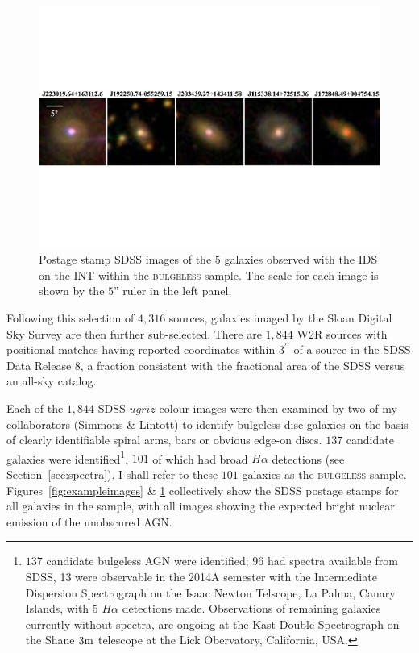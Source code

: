\begin{figure}
\centering
\includegraphics[width=\textwidth]{agn/mosaic_INT_gal_only.pdf}
\caption[SDSS images of 5 galaxies observed with the IDS on the INT]{Postage stamp SDSS images of the $5$ galaxies observed with the IDS on the INT within the \textsc{bulgeless} sample. The scale for each image is shown by the $5$'' ruler in the left panel.}
\label{fig:INTimages}
\end{figure}


Following this selection of $4,316$ sources, galaxies imaged by the Sloan Digital Sky Survey are then further sub-selected. There are $1,844$ W2R sources with positional matches having reported coordinates within $3^{\prime \prime}$ of a source in the SDSS \citep{york00} Data Release 8, a fraction consistent with the fractional area of the SDSS versus an all-sky catalog. %

Each of the $1, 844$ SDSS $ugriz$ colour images were then examined by two of my collaborators (Simmons \& Lintott) to identify bulgeless disc galaxies on the basis of clearly identifiable spiral arms, bars or obvious edge-on discs. $137$ candidate galaxies were identified\footnote{$137$ candidate bulgeless AGN were identified; 96 had spectra available from SDSS, 13 were observable in the 2014A semester with the Intermediate Dispersion Spectrograph on the Isaac Newton Telscope, La Palma, Canary Islands, with 5 $H\alpha$ detections made. Observations of remaining galaxies currently without spectra, are ongoing at the Kast Double Spectrograph on the Shane $3\rm{m}$ telescope at the Lick Obervatory, California, USA.}, $101$ of which had broad $H\alpha$ detections (see Section~\ref{sec:spectra}). I shall refer to these $101$ galaxies as the \textsc{bulgeless} sample. Figures~\ref{fig:exampleimages} \& \ref{fig:INTimages} collectively show the SDSS postage stamps for all galaxies in the sample, with all images showing the expected bright nuclear emission of the unobscured AGN. 

